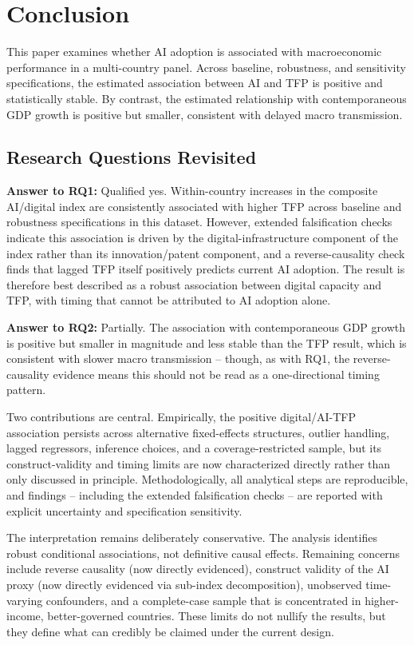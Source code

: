 \section{Conclusion}

This paper examines whether AI adoption is associated with macroeconomic performance in a multi-country panel. Across baseline, robustness, and sensitivity specifications, the estimated association between AI and TFP is positive and statistically stable. By contrast, the estimated relationship with contemporaneous GDP growth is positive but smaller, consistent with delayed macro transmission.

\subsection{Research Questions Revisited}

\textbf{Answer to RQ1:} Qualified yes. Within-country increases in the composite AI/digital index are consistently associated with higher TFP across baseline and robustness specifications in this dataset. However, extended falsification checks indicate this association is driven by the digital-infrastructure component of the index rather than its innovation/patent component, and a reverse-causality check finds that lagged TFP itself positively predicts current AI adoption. The result is therefore best described as a robust association between digital capacity and TFP, with timing that cannot be attributed to AI adoption alone.

\textbf{Answer to RQ2:} Partially. The association with contemporaneous GDP growth is positive but smaller in magnitude and less stable than the TFP result, which is consistent with slower macro transmission -- though, as with RQ1, the reverse-causality evidence means this should not be read as a one-directional timing pattern.

Two contributions are central. Empirically, the positive digital/AI-TFP association persists across alternative fixed-effects structures, outlier handling, lagged regressors, inference choices, and a coverage-restricted sample, but its construct-validity and timing limits are now characterized directly rather than only discussed in principle. Methodologically, all analytical steps are reproducible, and findings -- including the extended falsification checks -- are reported with explicit uncertainty and specification sensitivity.

The interpretation remains deliberately conservative. The analysis identifies robust conditional associations, not definitive causal effects. Remaining concerns include reverse causality (now directly evidenced), construct validity of the AI proxy (now directly evidenced via sub-index decomposition), unobserved time-varying confounders, and a complete-case sample that is concentrated in higher-income, better-governed countries. These limits do not nullify the results, but they define what can credibly be claimed under the current design.

